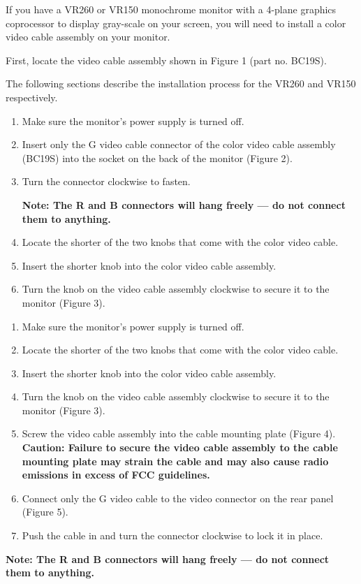 \documentclass{dec}
\begin{document}
If you have a VR260 or VR150 monochrome monitor with a 4-plane graphics
coprocessor to display gray-scale on your screen, you will need to install a
color video cable assembly on your monitor.

First, locate the video cable assembly shown in Figure 1 (part no. BC19S).

The following sections describe the installation process for the VR260 and
VR150 respectively.


\begin{enumerate}
\item Make sure the monitor's power supply is turned off.
\item Insert only the G video cable connector of the color video cable assembly
(BC19S) into the socket on the back of the monitor (Figure 2).
\item Turn the connector clockwise to fasten.

\textbf{Note: The R and B connectors will hang freely — do not connect
them to anything.}


\item Locate the shorter of the two knobs that come with the color video cable.
\item Insert the shorter knob into the color video cable assembly.
\item Turn the knob on the video cable assembly clockwise to secure it to the
monitor (Figure 3).


\end{enumerate}



\begin{enumerate}
\item Make sure the monitor's power supply is turned off.
\item Locate the shorter of the two knobs that come with the color video cable.
\item Insert the shorter knob into the color video cable assembly.
\item Turn the knob on the video cable assembly clockwise to secure it to the monitor (Figure 3).
\item Screw the video cable assembly into the cable mounting plate (Figure 4).
\textbf{Caution: Failure to secure the video cable assembly to the cable
mounting plate may strain the cable and may also cause radio
emissions in excess of FCC guidelines.}
\item Connect only the G video cable to the video connector on the rear panel
(Figure 5).
\item Push the cable in and turn the connector clockwise to lock it in place.
\end{enumerate}
\textbf{Note: The R and B connectors will hang freely — do not connect them
to anything.}
\end{document}
